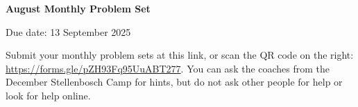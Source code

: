 \documentclass[12pt]{article}
\begin{document}
\begin{center} \bfseries \large
    August Monthly Problem Set

    Due date: 13 September 2025
\end{center}

\bigskip
\begin{vwcol}[widths={0.8,0.2},rule=0pt]
    Submit your monthly problem sets at this link, or scan the QR code on the right: \url{https://forms.gle/pZH93Fq95UuABT277}.
    You can ask the coaches from the December Stellenbosch Camp for hints, but do not ask other people for help or look for help online.
    
\end{vwcol}
\vspace{-2\baselineskip}
\end{document}
